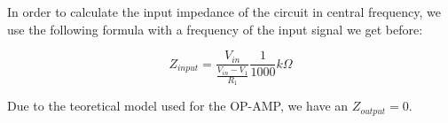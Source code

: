 In order to calculate the input impedance of the circuit in central frequency,
we use the following formula with a frequency of the input signal we get before:

\begin{equation}
  Z_{input} = \frac{V_{in}}{\frac{V_{in} - V_1}{R_1}} \frac{1}{1000} k \Omega
\end{equation}

Due to the teoretical model used for the OP-AMP, we have an $Z_{output} = 0$.


\begin{table}[h]
  {
    \centering
    \begin{tabular}{|c|c|c|}
      \hline
      
    \end{tabular}
    \label{tab:TheoreticalResults}
    \caption{ }
  }
\end{table}

